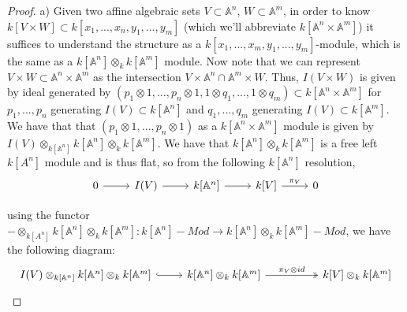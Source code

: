 \documentclass{article}
\newcommand{\bb}[1]{\mathbb{#1}}
\begin{document}
\begin{proof}
  a) Given two affine algebraic sets $V \subset \bb{A}^{n}$, $W \subset \bb{A}^{m}$, in order to know $k[V \times W] \subset k[x_{1},...,x_{n},y_{1},...,y_{m}]$ (which we'll abbreviate $k[\bb{A}^{n}\times \bb{A}^{m}]$) it suffices to understand the structure as a $k[x_{1},...,x_{m},y_{1},...,y_{m}]$-module, which is the same as a $k[\bb{A}^{n}]\otimes_{k} k[\bb{A}^{m}]$ module. Now note that we can represent $V \times W \subset \bb{A}^{n} \times \bb{A}^{m}$ as the intersection $V \times \bb{A}^{n} \cap \bb{A}^{m} \times W$. Thus, $I(V \times W)$ is given by ideal generated by $(p_{1}\otimes 1,...,p_{n}\otimes 1, 1 \otimes q_{1},...,1\otimes q_{m}) \subset k[\bb{A}^{n} \times \bb{A}^{m}]$ for $p_{1},...,p_{n}$ generating $I(V) \subset k[\bb{A}^{n}]$ and $q_{1},...,q_{m}$ generating $I(V) \subset k[\bb{A}^{m}]$. We have that that $(p_{1}\otimes 1,...,p_{n} \otimes 1)$ as a $k[\bb{A}^{n}\times \bb{A}^{m}]$ module is given by $I(V) \otimes_{k[\bb{A}^{n}]} k[\bb{A}^{n}] \otimes_{k} k[\bb{A}^{m}]$. We have that $k[\bb{A}^{n}]\otimes_{k} k[\bb{A}^{m}]$ is a free left $k[A^{n}]$ module and is thus flat, so from the following $k[\bb{A}^{n}]$ resolution,
  \[
    \begin{tikzcd}
0 \arrow[r] & I(V) \arrow[r] & {k[\bb{A}^{n}]} \arrow[r] & {k[V]} \arrow[r, "\pi_{V}"] & 0
\end{tikzcd}
    \]

  using the functor $- \otimes_{k[A^{n}]} k[\bb{A}^{n}] \otimes_{k} k[\bb{A}^{m}]: k[\bb{A}^{n}]-Mod \to k[\bb{A}^{n}]\otimes_{k}k[\bb{A}^{m}] - Mod$, we have the following diagram:
  \[
    \begin{tikzcd}
{I(V) \otimes_{k[\bb{A}^{n}]} k[\bb{A}^{n}] \otimes_{k} k[\bb{A}^{m}]} \arrow[r, hook] &  {k[\bb{A}^{n}] \otimes_{k} k[\bb{A}^{m}]} \arrow[rr, two heads, "\pi_{V} \otimes id"] & &  {k[V] \otimes_{k} k[\bb{A}^{m}]}
\end{tikzcd}
\]


\end{proof}
\end{document}

